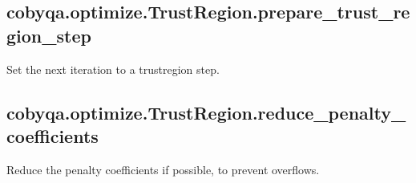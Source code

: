 \documentclass[letterpaper,10pt,english]{sphinxmanual}
\begin{document}
\begin{fulllineitems}
\begin{fulllineitems}
\begin{quote}
\begin{description}
\begin{description}
\end{description}

\end{description}\end{quote}

\end{fulllineitems}



\subsection{cobyqa.optimize.TrustRegion.prepare\_trust\_region\_step}
\label{\detokenize{refs/generated/cobyqa.optimize.TrustRegion.prepare_trust_region_step:cobyqa-optimize-trustregion-prepare-trust-region-step}}\label{\detokenize{refs/generated/cobyqa.optimize.TrustRegion.prepare_trust_region_step::doc}}

\begin{fulllineitems}
\label{\detokenize{refs/generated/cobyqa.optimize.TrustRegion.prepare_trust_region_step:cobyqa.optimize.TrustRegion.prepare_trust_region_step}}
\sphinxAtStartPar
Set the next iteration to a trust\sphinxhyphen{}region step.

\end{fulllineitems}



\subsection{cobyqa.optimize.TrustRegion.reduce\_penalty\_coefficients}
\label{\detokenize{refs/generated/cobyqa.optimize.TrustRegion.reduce_penalty_coefficients:cobyqa-optimize-trustregion-reduce-penalty-coefficients}}\label{\detokenize{refs/generated/cobyqa.optimize.TrustRegion.reduce_penalty_coefficients::doc}}

\begin{fulllineitems}
\label{\detokenize{refs/generated/cobyqa.optimize.TrustRegion.reduce_penalty_coefficients:cobyqa.optimize.TrustRegion.reduce_penalty_coefficients}}
\sphinxAtStartPar
Reduce the penalty coefficients if possible, to prevent overflows.

\end{fulllineitems}
\end{fulllineitems}
\end{document}
